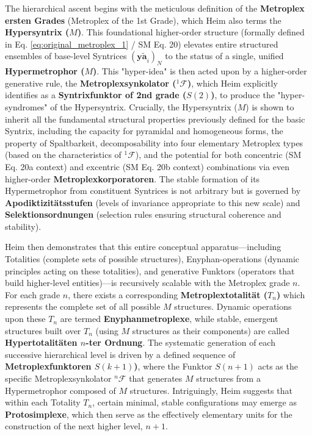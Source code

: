 \documentclass[12pt]{article}
\newcommand{\syntrix}{\bm{y\widetilde{a}}}
\def\metroplex#1#2{M}%
\newcommand{\hypersyntrix}{\metroplex{1}{F}}
\newcommand{\hypermetrophor}[1]{%
  \metroplex{#1}{a}%
}
\newcommand{\metroplexsynkolator}[1]{{}^{#1}\mathcal{F}}
\newcommand{\metroplextotalitaet}[1]{T_{#1}}
\newcommand{\metroplexfunktor}{S}
\begin{document}
The hierarchical ascent begins with the meticulous definition of the \textbf{Metroplex ersten Grades} (Metroplex of the 1st Grade), which Heim also terms the \textbf{Hypersyntrix (\(\hypersyntrix\))}. This foundational higher-order structure (formally defined in Eq. \eqref{eq:original_metroplex_1} / SM Eq. 20) elevates entire structured ensembles of base-level Syntrices \( (\syntrix_i)_N \) to the status of a single, unified \textbf{Hypermetrophor (\(\hypermetrophor{1}\))}. This "hyper-idea" is then acted upon by a higher-order generative rule, the \textbf{Metroplexsynkolator (\(\metroplexsynkolator{1}\))}, which Heim explicitly identifies as a \textbf{Syntrixfunktor of 2nd grade (\(\metroplexfunktor(2)\))}, to produce the "hyper-syndromes" of the Hypersyntrix. Crucially, the Hypersyntrix (\(\hypersyntrix\)) is shown to inherit all the fundamental structural properties previously defined for the basic Syntrix, including the capacity for pyramidal and homogeneous forms, the property of Spaltbarkeit, decomposability into four elementary Metroplex types (based on the characteristics of \( \metroplexsynkolator{1} \)), and the potential for both concentric (SM Eq. 20a context) and excentric (SM Eq. 20b context) combinations via even higher-order \textbf{Metroplexkorporatoren}. The stable formation of its Hypermetrophor from constituent Syntrices is not arbitrary but is governed by \textbf{Apodiktizitätsstufen} (levels of invariance appropriate to this new scale) and \textbf{Selektionsordnungen} (selection rules ensuring structural coherence and stability).

Heim then demonstrates that this entire conceptual apparatus—including Totalities (complete sets of possible structures), Enyphan-operations (dynamic principles acting on these totalities), and generative Funktors (operators that build higher-level entities)—is recursively scalable with the Metroplex grade \( n \). For each grade \( n \), there exists a corresponding \textbf{Metroplextotalität (\( \metroplextotalitaet{n} \))} which represents the complete set of all possible \( \metroplex{n}{} \) structures. Dynamic operations upon these \( \metroplextotalitaet{n} \) are termed \textbf{Enyphanmetroplexe}, while stable, emergent structures built over \( \metroplextotalitaet{n} \) (using \( \metroplex{n}{} \) structures as their components) are called \textbf{Hypertotalitäten \( n \)-ter Ordnung}. The systematic generation of each successive hierarchical level is driven by a defined sequence of \textbf{Metroplexfunktoren \( \metroplexfunktor(k+1) \))}, where the Funktor \( \metroplexfunktor(n+1) \) acts as the specific Metroplexsynkolator \( \metroplexsynkolator{n}{} \) that generates \( \metroplex{n}{} \) structures from a Hypermetrophor composed of \( \metroplex{n-1}{} \) structures. Intriguingly, Heim suggests that within each Totality \( \metroplextotalitaet{n} \), certain minimal, stable configurations may emerge as \textbf{Protosimplexe}, which then serve as the effectively elementary units for the construction of the next higher level, \(n+1\).
\end{document}
